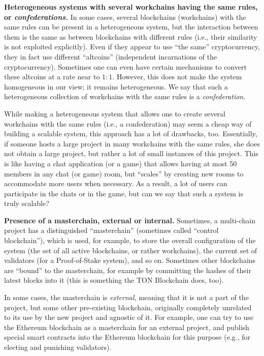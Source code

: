 \documentclass[12pt,oneside]{article}
\def\makepoint#1{\medbreak\noindent{\bf #1.\ }}
\def\nxsubpoint{\refstepcounter{subsubsection}%
  \smallbreak\makepoint{\thesubsubsection}}
\def\embt(#1.){\textbf{#1.}}
\begin{document}
\nxsubpoint\label{sp:het.confed} \embt(Heterogeneous systems with
several workchains having the same rules, or {\em confederations}.)
In some cases, several blockchains (work\-chains) with the same rules
can be present in a heterogeneous system, but the interaction between
them is the same as between blockchains with different rules (i.e.,
their similarity is not exploited explicitly). Even if they appear to
use ``the same'' cryptocurrency, they in fact use different
``altcoins'' (independent incarnations of the
cryptocurrency). Sometimes one can even have certain mechanisms to
convert these altcoins at a rate near to $1:1$. However, this does not
make the system homogeneous in our view; it remains heterogeneous. We
say that such a heterogeneous collection of workchains with the same
rules is a {\em confederation}.

While making a heterogeneous system that allows one to create several
work\-chains with the same rules (i.e., a confederation) may seem a
cheap way of building a scalable system, this approach has a lot of
drawbacks, too. Essentially, if someone hosts a large project in many
workchains with the same rules, she does not obtain a large project,
but rather a lot of small instances of this project. This is like
having a chat application (or a game) that allows having at most 50
members in any chat (or game) room, but ``scales'' by creating new
rooms to accommodate more users when necessary. As a result, a lot of
users can participate in the chats or in the game, but can we say that
such a system is truly scalable?

\nxsubpoint\label{sp:pres.masterch} \embt(Presence of a masterchain,
external or internal.)  Sometimes, a multi-chain project has a
distinguished ``masterchain'' (sometimes called ``control
blockchain''), which is used, for example, to store the overall
configuration of the system (the set of all active blockchains, or
rather workchains), the current set of validators (for a
Proof-of-Stake system), and so on. Sometimes other blockchains are
``bound'' to the masterchain, for example by committing the hashes of
their latest blocks into it (this is something the TON Blockchain
does, too).

In some cases, the masterchain is {\em external}, meaning that it is
not a part of the project, but some other pre-existing blockchain,
originally completely unrelated to its use by the new project and
agnostic of it. For example, one can try to use the Ethereum
blockchain as a masterchain for an external project, and publish
special smart contracts into the Ethereum blockchain for this purpose
(e.g., for electing and punishing validators).
\end{document}
